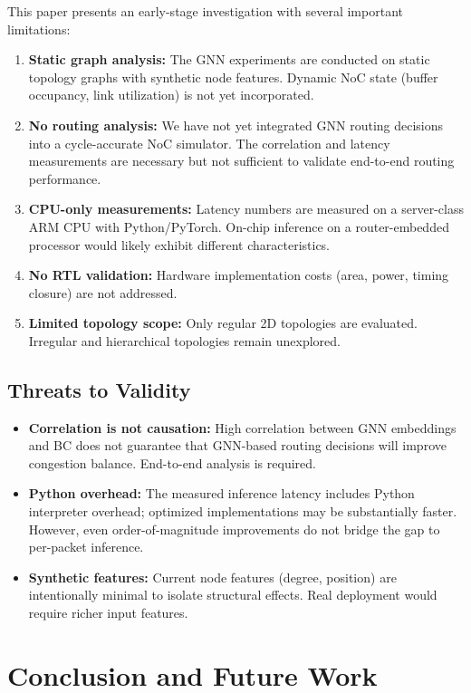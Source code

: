 \documentclass[conference]{IEEEtran}
\begin{document}
This paper presents an early-stage investigation with several important limitations:
\begin{enumerate}
    \item \textbf{Static graph analysis:} The GNN experiments are conducted on static topology graphs with synthetic node features. Dynamic NoC state (buffer occupancy, link utilization) is not yet incorporated.
    \item \textbf{No routing analysis:} We have not yet integrated GNN routing decisions into a cycle-accurate NoC simulator. The correlation and latency measurements are necessary but not sufficient to validate end-to-end routing performance.
    \item \textbf{CPU-only measurements:} Latency numbers are measured on a server-class ARM CPU with Python/PyTorch. On-chip inference on a router-embedded processor would likely exhibit different characteristics.
    \item \textbf{No RTL validation:} Hardware implementation costs (area, power, timing closure) are not addressed.
    \item \textbf{Limited topology scope:} Only regular 2D topologies are evaluated. Irregular and hierarchical topologies remain unexplored.
\end{enumerate}

\subsection{Threats to Validity}

\begin{itemize}
    \item \textbf{Correlation is not causation:} High correlation between GNN embeddings and BC does not guarantee that GNN-based routing decisions will improve congestion balance. End-to-end analysis is required.
    \item \textbf{Python overhead:} The measured inference latency includes Python interpreter overhead; optimized implementations may be substantially faster. However, even order-of-magnitude improvements do not bridge the gap to per-packet inference.
    \item \textbf{Synthetic features:} Current node features (degree, position) are intentionally minimal to isolate structural effects. Real deployment would require richer input features.
\end{itemize}

\section{Conclusion and Future Work}
\label{sec:conclusion}
\end{document}
